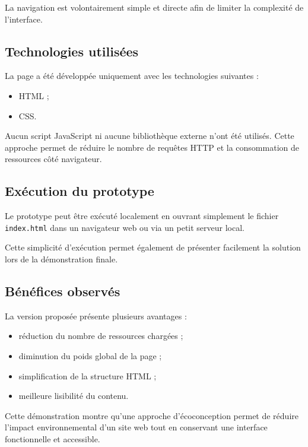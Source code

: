 \documentclass[11pt,a4paper]{article}
\begin{document}
La navigation est volontairement simple et directe afin de limiter la complexité de l'interface.

\subsection{Technologies utilisées}

La page a été développée uniquement avec les technologies suivantes :

\begin{itemize}
\item HTML ;
\item CSS.
\end{itemize}

Aucun script JavaScript ni aucune bibliothèque externe n'ont été utilisés. Cette approche permet de réduire le nombre de requêtes HTTP et la consommation de ressources côté navigateur.

\subsection{Exécution du prototype}

Le prototype peut être exécuté localement en ouvrant simplement le fichier \texttt{index.html} dans un navigateur web ou via un petit serveur local.

Cette simplicité d'exécution permet également de présenter facilement la solution lors de la démonstration finale.

\subsection{Bénéfices observés}

La version proposée présente plusieurs avantages :

\begin{itemize}
\item réduction du nombre de ressources chargées ;
\item diminution du poids global de la page ;
\item simplification de la structure HTML ;
\item meilleure lisibilité du contenu.
\end{itemize}

Cette démonstration montre qu'une approche d'écoconception permet de réduire l'impact environnemental d'un site web tout en conservant une interface fonctionnelle et accessible.

\end{document}
